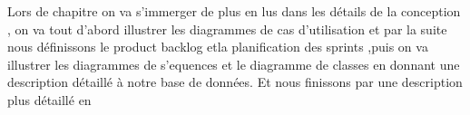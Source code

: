 


Lors de chapitre on va s'immerger de plus en lus dans les d\'{e}tails de la conception ,
on va tout d'abord illustrer les diagrammes de cas d'utilisation et par la suite nous d\'{e}finissons le product backlog
 etla planification des sprints
,puis on va illustrer les diagrammes de s'{e}quences et
 le diagramme de classes en donnant une description d\'{e}taill\'{e} à notre base de donn\'{e}es.
Et nous finissons par  une description plus d\'{e}taill\'{e} en 







